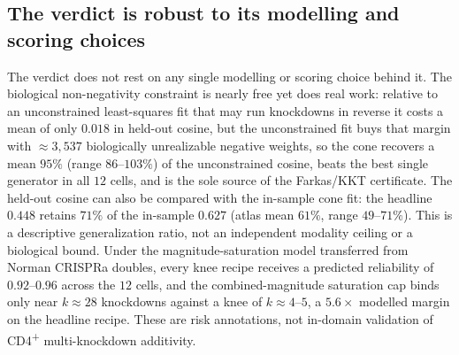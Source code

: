 \subsection{The verdict is robust to its modelling and scoring choices}
\label{sec:results-robustness}
The verdict does not rest on any single modelling or scoring choice behind it. The biological
non-negativity constraint is nearly free yet does real work: relative to an unconstrained
least-squares fit that may run knockdowns in reverse it costs a mean of only $0.018$ in
held-out cosine, but the unconstrained fit buys that margin with $\approx\!3{,}537$
biologically unrealizable negative weights, so the cone recovers a mean $95\%$ (range
$86$--$103\%$) of the unconstrained cosine, beats the best single generator in all $12$ cells,
and is the sole source of the Farkas/KKT certificate. The held-out cosine can also be compared
with the in-sample cone fit: the headline $0.448$ retains $71\%$ of the in-sample $0.627$
(atlas mean $61\%$, range $49$--$71\%$). This is a descriptive generalization ratio, not an
independent modality ceiling or a biological bound. Under the magnitude-saturation model
transferred from Norman CRISPRa doubles, every knee recipe receives a predicted reliability of
$0.92$--$0.96$ across the $12$ cells, and the combined-magnitude
saturation cap binds only near $k\approx28$ knockdowns against a knee of $k\approx4$--$5$, a
$5.6\times$ modelled margin on the headline recipe. These are risk annotations, not in-domain
validation of CD4\textsuperscript{+} multi-knockdown additivity.

